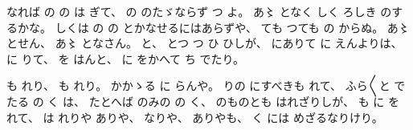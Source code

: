 %
なれば
の
の
は
ぎて、
%
の
のたゞならず
つ
よ。
%
あ〻
となく
しく
ろしき
のするかな。
%
しくは
の
の
とかなせるにはあらずや、
%
ても
つても
の
からぬ。
%
あ〻
とせん、
%
あ〻
となさん。
%
と、
%
とつ
つ
ひ
ひしが、
%
にありて
に
えんよりは、
%
に
りて、
%
を
はんと、
%
に
をかへて
ち
でたり。

も
れり、
%
も
れり。
%
かかゝる
に
らんや。
%
りの
にすべきも
れて、
%
ふら〳〵と
でたる
の
く
は、
%
たとへば
のみの
の
く、
%
のものとも
はれざりしが、
%
も
に
を
れて、
%
は
れりや
ありや、
%
なりや、
%
ありやも、
%
く
には
めざるなりけり。

